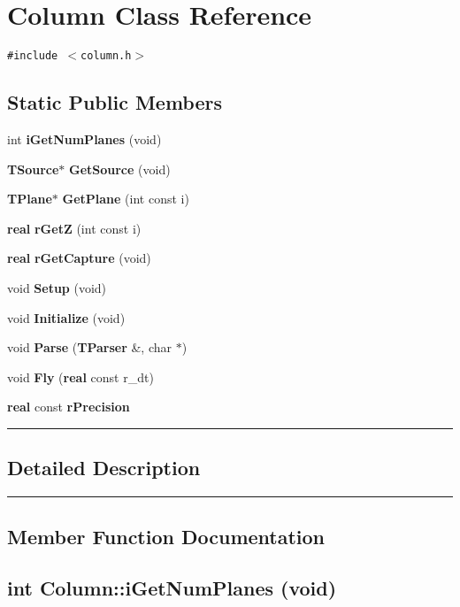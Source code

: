 \section{Column  Class Reference}
\label{Column}


{\tt \#include $<$column.h$>$}

\subsection*{Static Public Members}
\begin{CompactItemize}
\item 
int {\bf i\-Get\-Num\-Planes} (void)
\item 
{\bf TSource}$\ast$ {\bf Get\-Source} (void)
\item 
{\bf TPlane}$\ast$ {\bf Get\-Plane} (int const i)
\item 
{\bf real} {\bf r\-Get\-Z} (int const i)
\item 
{\bf real} {\bf r\-Get\-Capture} (void)
\item 
void {\bf Setup} (void)
\item 
void {\bf Initialize} (void)
\item 
void {\bf Parse} ({\bf TParser} \&, char $\ast$)
\item 
void {\bf Fly} ({\bf real} const r\_\-dt)
\item 
{\bf real} const {\bf r\-Precision}
\end{CompactItemize}
\vspace{0.4cm}\hrule\vspace{0.2cm}
\subsection*{Detailed Description}
\vspace{0.4cm}\hrule\vspace{0.2cm}
\subsection*{Member Function Documentation}
\label{Column_d0}
\subsection{\setlength{\rightskip}{0pt plus 5cm}int Column::i\-Get\-Num\-Planes (void)\hspace{0.3cm}{\tt  [inline, static]}}

